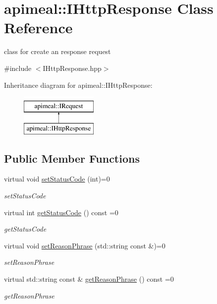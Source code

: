 \hypertarget{classapimeal_1_1IHttpResponse}{\section{apimeal\-:\-:I\-Http\-Response Class Reference}
\label{classapimeal_1_1IHttpResponse}
}


class for create an response request  




{\ttfamily \#include $<$I\-Http\-Response.\-hpp$>$}

Inheritance diagram for apimeal\-:\-:I\-Http\-Response\-:\begin{figure}[H]
\begin{center}
\leavevmode
\includegraphics[height=2.000000cm]{classapimeal_1_1IHttpResponse}
\end{center}
\end{figure}
\subsection*{Public Member Functions}
\begin{DoxyCompactItemize}
\item 
virtual void \hyperlink{classapimeal_1_1IHttpResponse_aaf76ae8138e5c479804f54a3bd0ab78b}{set\-Status\-Code} (int)=0
\begin{DoxyCompactList}\small\item\em set\-Status\-Code \end{DoxyCompactList}\item 
virtual int \hyperlink{classapimeal_1_1IHttpResponse_a66455ecf6c9f5920bff33994eb3f0953}{get\-Status\-Code} () const =0
\begin{DoxyCompactList}\small\item\em get\-Status\-Code \end{DoxyCompactList}\item 
virtual void \hyperlink{classapimeal_1_1IHttpResponse_a4dd9ad19f35488e9f1542d2718b122bd}{set\-Reason\-Phrase} (std\-::string const \&)=0
\begin{DoxyCompactList}\small\item\em set\-Reason\-Phrase \end{DoxyCompactList}\item 
virtual std\-::string const \& \hyperlink{classapimeal_1_1IHttpResponse_a305d866a495d4ca04a5ccefb245457b2}{get\-Reason\-Phrase} () const =0
\begin{DoxyCompactList}\small\item\em get\-Reason\-Phrase \end{DoxyCompactList}\end{DoxyCompactItemize}


